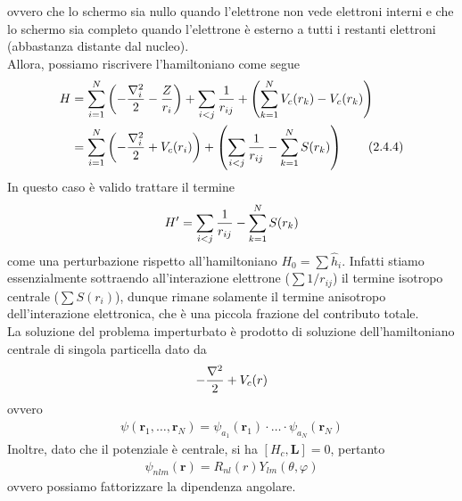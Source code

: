 \documentclass{article}
\begin{document}
ovvero che lo schermo sia nullo quando l'elettrone non vede elettroni interni e che lo schermo sia completo quando l'elettrone è esterno a tutti i restanti elettroni (abbastanza distante dal nucleo). \\
Allora, possiamo riscrivere l'hamiltoniano come segue 
\begin{align}
    H &= \sum_{i = 1}^N\left(-\frac{\nabla^2_i}{2} - \frac{Z}{r_i}\right) + \sum_{i < j}\frac{1}{r_{ij}} + \left(\sum_{k = 1}^N V_c(r_k) - V_c(r_k)\right) \notag \\
    &= \sum_{i = 1}^N\left(-\frac{\nabla^2_i}{2} + V_c(r_i)\right) + \left(\sum_{i < j}\frac{1}{r_{ij}} - \sum_{k = 1}^N S(r_k)\right) \tag{2.4.4}
\end{align}
In questo caso è valido trattare il termine 
\begin{align}
    H' = \sum_{i < j}\frac{1}{r_{ij}} - \sum_{k = 1}^N S(r_k) \notag
\end{align}
come una perturbazione rispetto all'hamiltoniano $H_0 = \sum \hat{h}_i$. Infatti stiamo essenzialmente sottraendo all'interazione elettrone ($\sum 1/r_{ij}$) il termine isotropo centrale ($\sum S(r_i)$), dunque rimane solamente il termine anisotropo dell'interazione elettronica, che è una piccola frazione del contributo totale. \\
La soluzione del problema imperturbato è prodotto di soluzione dell'hamiltoniano centrale di singola particella dato da 
\begin{align}
    -\frac{\nabla^2}{2} + V_c(r) \notag
\end{align} 
ovvero
\begin{align}
    \psi(\mathbf{r}_1, \dots, \mathbf{r}_N) = \psi_{a_1}(\mathbf{r}_1) \cdot \dots \cdot \psi_{a_N}(\mathbf{r}_N) \tag{2.4.5}
\end{align}
Inoltre, dato che il potenziale è centrale, si ha $[H_c, \mathbf{L}] = 0$, pertanto
\begin{align}
    \psi_{nlm}(\mathbf{r}) = R_{nl}(r)Y_{lm}(\theta, \varphi) \tag{2.4.6}
\end{align}
ovvero possiamo fattorizzare la dipendenza angolare.

\newpage
\end{document}
